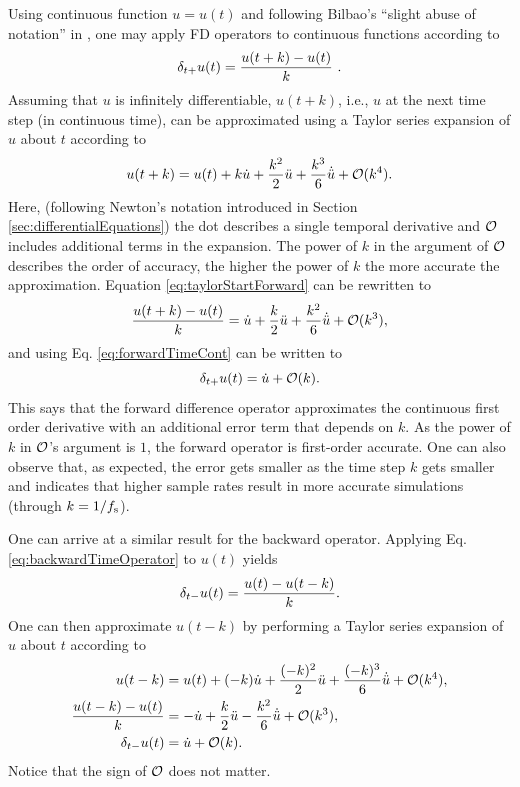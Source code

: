 Using continuous function $u=u(t)$ and following Bilbao's ``slight abuse of notation'' in \cite{theBible}, one may apply FD operators to continuous functions according to 
\begin{equation}\label{eq:forwardTimeCont}
    \delta_{t+} u(t) = \frac{u(t+k) - u(t)}{k}\ .
\end{equation}
%
Assuming that $u$ is infinitely differentiable, $u(t+k)$, i.e., $u$ at the next time step (in continuous time), can be approximated using a Taylor series expansion of $u$ about $t$ according to
\begin{equation}\label{eq:taylorStartForward}
    u(t+k) = u(t) + k \dot u + \frac{k^2}{2} \ddot u + \frac{k^3}{6} \dot{\ddot{u}} + \mathcal{O}(k^4).
\end{equation}
Here, (following Newton's notation introduced in Section \ref{sec:differentialEquations}) the dot describes a single temporal derivative and $\mathcal{O}$ includes additional terms in the expansion. The power of $k$ in the argument of $\mathcal{O}$ describes the order of accuracy, the higher the power of $k$ the more accurate the approximation. Equation \eqref{eq:taylorStartForward} can be rewritten to 
\begin{equation*}
    \frac{u(t+k) - u(t)}{k} = \dot u + \frac{k}{2} \ddot u +\frac{k^2}{6} \dot{\ddot{u}} + \mathcal{O}(k^3),
\end{equation*}
and using Eq. \eqref{eq:forwardTimeCont} can be written to
\begin{equation}
    \delta_{t+} u(t) = \dot u + \mathcal{O}(k).
\end{equation}
This says that the forward difference operator approximates the continuous first order derivative with an additional error term that depends on $k$.
As the power of $k$ in $\mathcal{O}$'s argument is $1$, the forward operator is first-order accurate. One can also observe that, as expected, the error gets smaller as the time step $k$ gets smaller and indicates that higher sample rates result in more accurate simulations (through $k=1/f_\text{s}$).

One can arrive at a similar result for the backward operator. Applying Eq. \eqref{eq:backwardTimeOperator} to $u(t) $ yields
\begin{equation}
    \delta_{t-} u(t) = \frac{u(t) - u(t-k)}{k}.
\end{equation}
One can then approximate $u(t-k)$ by performing a Taylor series expansion of $u$ about $t$ according to
\begin{align}
    u(t-k) &= u(t) + (-k) \dot u + \frac{(-k)^2}{2} \ddot u +\frac{(-k)^3}{6}\dot{\ddot{u}} + \mathcal{O}(k^4),\label{eq:taylorStartBackward}\\
    \frac{u(t-k) - u(t)}{k} &= -\dot u + \frac{k}{2} \ddot u - \frac{k^2}{6}\dot{\ddot{u}} + \mathcal{O}(k^3),\nonumber\\
    \delta_{t-} u(t) &= \dot u + \mathcal{O}(k).
\end{align}
Notice that the sign of $\mathcal{O}$ does not matter.


